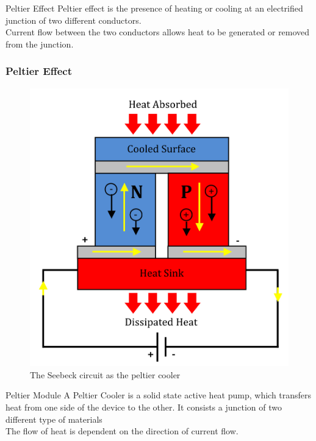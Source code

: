 \documentclass[10pt]{beamer}
\begin{document}
{
	\begin{frame}{Peltier Effect}
		Peltier effect is the presence of heating or cooling at an electrified junction of two different conductors. \\
		\vspace{5mm}
		Current flow between the two conductors allows heat to be generated or removed from the junction.
	\end{frame}
}
{
	\begin{frame}
		\frametitle{Peltier Effect}
		\begin{figure}
			\includegraphics[scale=1.4]{peltier_effect}
			\caption{The Seebeck circuit as the peltier cooler}
		\end{figure}
	\end{frame}
}
{
\begin{frame}{Peltier Module}
	A Peltier Cooler is a solid state active heat pump, which transfers heat from one side of the device to the other. It consists a junction of two different type of materials\\
	\vspace{5mm}
	The flow of heat is dependent on the direction of current flow.
\end{frame}
}
\end{document}
